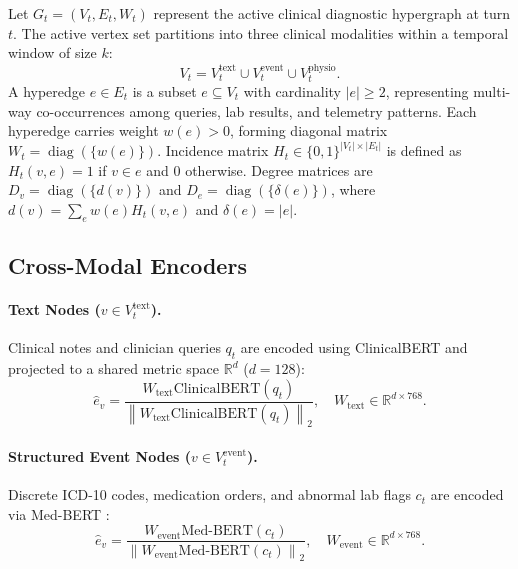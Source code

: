 \documentclass[10pt, onecolumn]{article}
\DeclareMathOperator{\diag}{diag}
\newcommand{\R}{\mathbb{R}}
\newcommand{\norm}[1]{\left\lVert#1\right\rVert}
\begin{document}
Let $G_t = (V_t, E_t, W_t)$ represent the active clinical diagnostic hypergraph at turn $t$. The active vertex set partitions into three clinical modalities within a temporal window of size $k$:
\begin{equation}
  V_t = V_t^{\text{text}} \cup V_t^{\text{event}} \cup V_t^{\text{physio}}.
  \label{eq:node_partition}
\end{equation}
A hyperedge $e \in E_t$ is a subset $e \subseteq V_t$ with cardinality $|e| \ge 2$, representing multi-way co-occurrences among queries, lab results, and telemetry patterns. Each hyperedge carries weight $w(e) > 0$, forming diagonal matrix $W_t = \diag(\{w(e)\})$. Incidence matrix $H_t \in \{0, 1\}^{|V_t| \times |E_t|}$ is defined as $H_t(v, e) = 1$ if $v \in e$ and $0$ otherwise. Degree matrices are $D_v = \diag(\{d(v)\})$ and $D_e = \diag(\{\delta(e)\})$, where $d(v) = \sum_{e} w(e) H_t(v, e)$ and $\delta(e) = |e|$.

\subsection{Cross-Modal Encoders}
\paragraph{Text Nodes ($v \in V_t^{\text{text}}$).}
Clinical notes and clinician queries $q_t$ are encoded using ClinicalBERT \cite{alsentzer2019publicly} and projected to a shared metric space $\R^d$ ($d=128$):
\begin{equation}
  \hat{e}_v = \frac{W_{\text{text}} \text{ClinicalBERT}(q_t)}{\norm{W_{\text{text}} \text{ClinicalBERT}(q_t)}_2}, \quad W_{\text{text}} \in \R^{d \times 768}.
  \label{eq:text_proj}
\end{equation}

\paragraph{Structured Event Nodes ($v \in V_t^{\text{event}}$).}
Discrete ICD-10 codes, medication orders, and abnormal lab flags $c_t$ are encoded via Med-BERT \cite{rasmy2021medbert}:
\begin{equation}
  \hat{e}_v = \frac{W_{\text{event}} \text{Med-BERT}(c_t)}{\norm{W_{\text{event}} \text{Med-BERT}(c_t)}_2}, \quad W_{\text{event}} \in \R^{d \times 768}.
  \label{eq:event_proj}
\end{equation}
\end{document}
